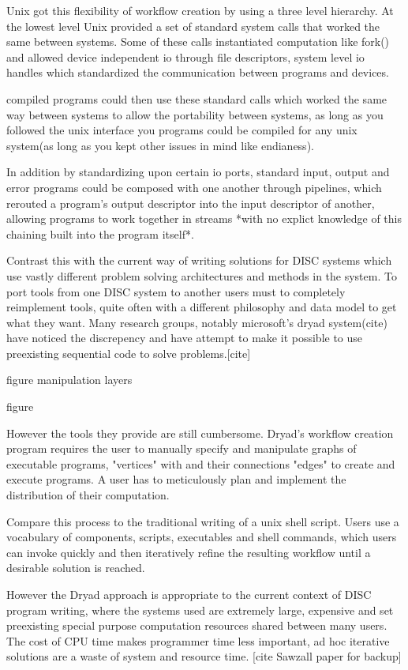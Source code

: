 \documentclass[11pt, letterpaper]{article}
\begin{document}
Unix got this flexibility of workflow creation by using a three level hierarchy. At the lowest level Unix provided a set of standard system calls that worked the same between systems. Some of these calls instantiated computation like fork() and allowed device independent io through file descriptors, system level io handles which standardized the communication between programs and devices.  

compiled programs could then use these standard calls which worked the same way between systems to allow the portability between systems, as long as you followed the unix interface you programs could be compiled for any unix system(as long as you kept other issues in mind like endianess).   

In addition by standardizing upon certain io ports, standard input, output and error programs could be composed with one another through pipelines, which rerouted a program's output descriptor into the input descriptor of another, allowing programs to work together in streams *with no explict knowledge of this chaining built into the program itself*.   

Contrast this with the current way of writing solutions for DISC systems which use vastly different problem solving architectures and methods in the system. To port tools from one DISC system to another users must to completely reimplement tools, quite often with a different philosophy and data model to get what they want. Many research groups, notably microsoft's dryad system(cite) have noticed the discrepency and have attempt to make it possible to use preexisting sequential code to solve problems.[cite]  

figure {
manipulation layers
}

figure {

}
However the tools they provide are still cumbersome. Dryad's workflow creation program requires the user to manually specify and manipulate graphs of executable programs, "vertices" with and their connections "edges" to create and execute programs. A user has to meticulously plan and implement the distribution of their computation.   


Compare this process to the traditional writing of a unix shell script. Users use a vocabulary of components, scripts, executables and shell commands, which users can invoke quickly and then iteratively refine the resulting workflow until a desirable solution is reached.

However the Dryad approach is appropriate to the current context of DISC program writing, where the systems used are extremely large, expensive and set preexisting special purpose computation resources shared between many users. The cost of CPU time makes programmer time less important, ad hoc iterative solutions are a waste of system and resource time. [cite Sawzall paper for backup] 
\end{document}
